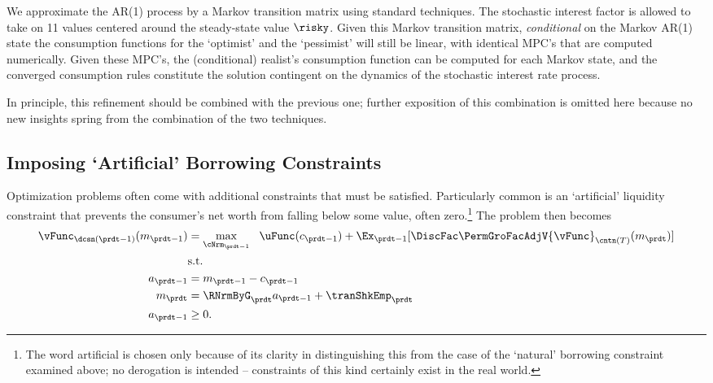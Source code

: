 We approximate the AR(1) process by a Markov transition matrix using standard techniques.  The stochastic interest factor is allowed to take
on 11 values centered around the steady-state value $\risky$.  Given this Markov transition matrix, \textit{conditional} on the Markov AR(1) state the consumption functions for the `optimist' and the `pessimist' will still be linear,
with identical MPC's that are computed numerically.  Given these MPC's, the (conditional) realist's consumption function can be computed for each Markov state, and the converged consumption rules constitute the solution contingent on the dynamics of the stochastic
interest rate process.

In principle, this refinement should be combined with the previous one;
further exposition of this combination is omitted here because no new
insights spring from the combination of the two techniques.



\hypertarget{imposing-artificial-borrowing-constraints}{}
\subsection{Imposing `Artificial' Borrowing Constraints}

Optimization problems often come with additional constraints that must
be satisfied.  Particularly common is an `artificial' liquidity constraint that
prevents the consumer's net worth from falling below some value, often
zero.\footnote{The word artificial is chosen only because of its clarity in distinguishing
  this from the case of the `natural' borrowing constraint examined above; no derogation is
  intended -- constraints of this kind certainly exist in the real world.}  The problem then becomes
\begin{equation*}\begin{gathered}\begin{aligned}
      \vFunc_{\dcsn(\prdt-1)}(m_{\prdt-1})  & = \max_{\cNrm_{\prdt-1}} ~~ \uFunc(c_{\prdt-1}) + \Ex_{\prdt-1} [\DiscFac \PermGroFacAdjV{\vFunc}_{\cntn(T)}(m_{\prdt})] \label{eq:ConstrArt}
      \\ & \mbox{s.t.}  \nonumber
      \\ a_{\prdt-1}  & = m_{\prdt-1} - c_{\prdt-1}
      \\ m_{\prdt}  & = \RNrmByG_{\prdt} a_{\prdt-1} + \tranShkEmp_{\prdt}
      \\ a_{\prdt-1} & \geq 0 .
    \end{aligned}\end{gathered}\end{equation*}


